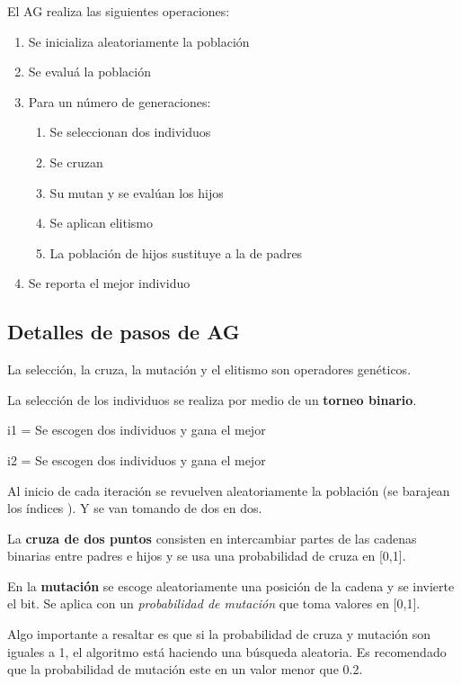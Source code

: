 \documentclass[conference]{IEEEtran}
\begin{document}
El AG realiza las siguientes operaciones:
\begin{enumerate}
\item Se inicializa aleatoriamente la población
\item Se evaluá la población
\item Para un número de generaciones:

	\begin{enumerate}
		\item Se seleccionan dos individuos
        \item Se cruzan
        \item Su mutan y se evalúan los hijos
        \item Se aplican elitismo
        \item La población de hijos sustituye a la de padres
	\end{enumerate}
	
	\item Se reporta el mejor individuo
\end{enumerate}

\subsection{Detalles de pasos de AG}

La selección, la cruza, la mutación y el elitismo son operadores genéticos. 

La selección de los individuos se realiza por medio de un \textbf{torneo binario}.

     i1 = Se escogen dos individuos y gana el mejor
     
     
     i2 = Se escogen dos individuos y gana el mejor 

   Al inicio de cada iteración se revuelven aleatoriamente
   la población (se barajean los índices ). Y se van tomando de
   dos en dos.

La \textbf{cruza de dos puntos} consisten en intercambiar partes de las cadenas binarias entre padres e hijos y se usa una probabilidad de cruza en [0,1].

En la \textbf{mutación} se escoge aleatoriamente una posición de la cadena y se invierte el bit. Se aplica con un \textit{probabilidad de mutación} que toma valores en [0,1].

Algo importante a resaltar es que si la probabilidad de cruza y mutación son iguales a 1, el algoritmo está haciendo una búsqueda aleatoria.  Es recomendado que la probabilidad de mutación este en un valor menor que 0.2.
\end{document}

